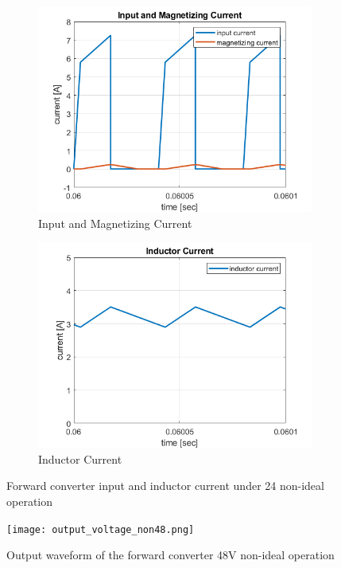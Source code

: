\begin{figure}[H]
\centering
\begin{subfigure}{7 cm}
  \centering
  \includegraphics[width=7 cm]{Figs/input_current_24_com.png}
  \caption{Input and Magnetizing Current}
  \label{fig:input_current_24_com}
\end{subfigure}%
\begin{subfigure}{7 cm}
  \centering
  \includegraphics[width=7 cm]{Figs/inductor_current_com.png}
  \caption{Inductor Current}
  \label{fig:inductor_current_24_com}
\end{subfigure}
\caption{Forward converter input and inductor current under 24 non-ideal operation}
\label{fig:current_24}
\end{figure}

\begin{center}
\begin{figure}[H]
\centering
\texttt{[image: output\_voltage\_non48.png]}
\caption{Output waveform of the forward converter 48V non-ideal operation}
\label{Output48com}
\end{figure}
\end{center}

